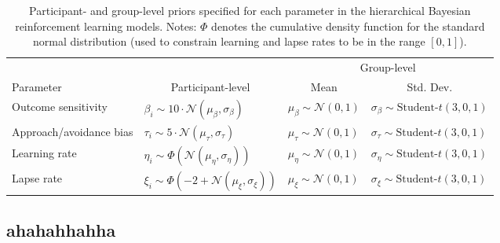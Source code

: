 \documentclass[a4paper,12pt]{article}
\begin{document}
\begin{refsection}[supp]
\begin{table}[h!]
    \centering
    \begin{tabular}{llll}
        \toprule
                  &                   & \multicolumn{2}{c}{Group-level} \\
        \cmidrule(lr){3-4}
        Parameter & \multicolumn{1}{c}{Participant-level} & \multicolumn{1}{c}{Mean} & \multicolumn{1}{c}{Std. Dev.} \\
        \midrule
        Outcome sensitivity & $\beta_i \sim 10 \cdot \mathcal{N}(\mu_\beta, \sigma_\beta)$ & $\mu_\beta \sim \mathcal{N}(0,1)$ & $\sigma_\beta \sim \text{Student-}t(3,0,1)$ \\ 
        Approach/avoidance bias & $\tau_i \sim 5 \cdot \mathcal{N}(\mu_\tau, \sigma_\tau)$ & $\mu_\tau \sim \mathcal{N}(0,1)$ & $\sigma_\tau \sim \text{Student-}t(3,0,1)$ \\ 
        Learning rate & $\eta_i \sim \Phi \left(\mathcal{N}(\mu_\eta, \sigma_\eta)\right)$ & $\mu_\eta \sim \mathcal{N}(0,1)$ & $\sigma_\eta \sim \text{Student-}t(3,0,1)$ \\ 
        Lapse rate & $\xi_i \sim \Phi \left(-2 + \mathcal{N}(\mu_\xi, \sigma_\xi)\right)$ & $\mu_\xi \sim \mathcal{N}(0,1)$ & $\sigma_\xi \sim \text{Student-}t(3,0,1)$ \\ 
        \bottomrule
    \end{tabular}
    \caption{Participant- and group-level priors specified for each parameter in the hierarchical Bayesian reinforcement learning models. Notes: $\Phi$ denotes the cumulative density function for the standard normal distribution (used to constrain learning and lapse rates to be in the range $[0,1]$).}
    \label{tab:priors}
\end{table}

\clearpage
\subsection*{ahahahhahha}


\end{refsection}
\end{document}
